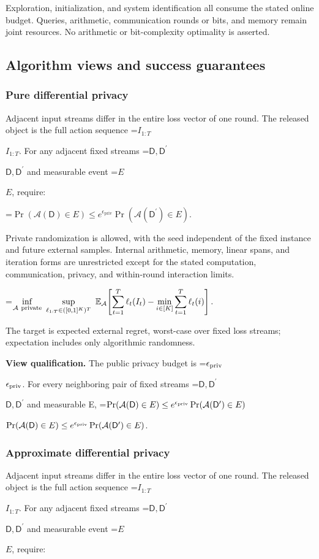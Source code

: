 \documentclass[10pt,a4paper]{article}
\newcommand{\AtlasMath}[1]{\par\begingroup\centering\setbox0=\hbox{$\displaystyle #1$}\ifdim\wd0>1.4\linewidth\typeout{ATLAS WIDE FORMULA: \the\wd0}\fi\ifdim\wd0>\linewidth\resizebox{\linewidth}{!}{\box0}\else\box0\fi\par\endgroup}
\newcommand{\AtlasInlineMath}[1]{\begingroup\setbox0=\hbox{$#1$}\ifdim\wd0>.4\linewidth\endgroup\AtlasMath{#1}\else\endgroup$#1$\fi}
\begin{document}
Exploration, initialization, and system identification all consume the stated online budget. Queries, arithmetic, communication rounds or bits, and memory remain joint resources. No arithmetic or bit-complexity optimality is asserted.

\subsection{Algorithm views and success guarantees}
\subsubsection{Pure differential privacy}
Adjacent input streams differ in the entire loss vector of one round. The released object is the full action sequence \AtlasInlineMath{I_{1:T}}. For any adjacent fixed streams \AtlasInlineMath{\mathsf D,\mathsf D^{\prime}} and measurable event \AtlasInlineMath{E}, require:


\AtlasMath{\Pr(\mathcal{A}(\mathsf D)\in E)\le e^{\epsilon_{\mathrm{priv}}}\Pr(\mathcal{A}(\mathsf D^{\prime})\in E).}


Private randomization is allowed, with the seed independent of the fixed instance and future external samples. Internal arithmetic, memory, linear spans, and iteration forms are unrestricted except for the stated computation, communication, privacy, and within-round interaction limits.


\AtlasMath{\inf_{\mathcal{A}\ \text{\text{private}}}\ \sup_{\ell_{1:T}\in([0,1]^K)^T}\ \mathbb{E}_{\mathcal{A}}\!\left[\sum_{t=1}^{T}\ell_t(I_t)-\min_{i\in[K]}\sum_{t=1}^{T}\ell_t(i)\right].}


The target is expected external regret, worst-case over fixed loss streams; expectation includes only algorithmic randomness.

\textbf{View qualification.} The public privacy budget is \AtlasInlineMath{\epsilon_{\rm priv}}. For every neighboring pair of fixed streams \AtlasInlineMath{\mathsf D,\mathsf D^{\prime}} and measurable E, \AtlasInlineMath{\Pr(\mathcal A(\mathsf D)\in E)\le e^{\epsilon_{\rm priv}}\Pr(\mathcal A(\mathsf D^{\prime})\in E)}.

\subsubsection{Approximate differential privacy}
Adjacent input streams differ in the entire loss vector of one round. The released object is the full action sequence \AtlasInlineMath{I_{1:T}}. For any adjacent fixed streams \AtlasInlineMath{\mathsf D,\mathsf D^{\prime}} and measurable event \AtlasInlineMath{E}, require:
\end{document}
